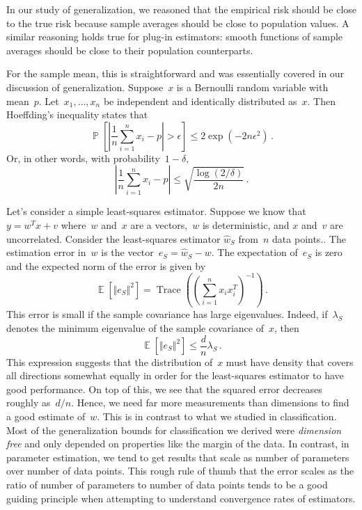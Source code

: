 \documentclass{tufte-book}
\begin{document}
In our study of generalization, we reasoned that the empirical risk
should be close to the true risk because sample averages should be close
to population values. A similar reasoning holds true for plug-in
estimators: smooth functions of sample averages should be close to their
population counterparts.

For the sample mean, this is straightforward and was essentially covered
in our discussion of generalization. Suppose~\(x\) is a Bernoulli random
variable with mean~\(p\). Let~\(x_1,\ldots,x_n\) be independent and
identically distributed as~\(x\). Then Hoeffding's inequality states
that \[
    \mathop\mathbb{P}\left[ \left| \frac{1}{n}\sum_{i=1}^n x_i - p \right| > \epsilon \right] \leq 2 \exp(-2n \epsilon^2)\,.
\] Or, in other words, with probability~\(1-\delta\), \[
     \left| \frac{1}{n}\sum_{i=1}^n x_i - p \right| \leq  \sqrt{\frac{\log(2/\delta)}{2n}}\,.
\]

Let's consider a simple least-squares estimator. Suppose we know that
\(y=w^T x + v\) where~\(w\) and~\(x\) are a vectors,~\(w\) is
deterministic, and \(x\) and~\(v\) are uncorrelated. Consider the
least-squares estimator \(\hat{w}_S\) from~\(n\) data points.. The
estimation error in~\(w\) is the vector~\(e_S = \hat{w}_S-w\). The
expectation of~\(e_S\) is zero and the expected norm of the error is
given by \[
    \mathop\mathbb{E}\left[ \Vert e_S \Vert^2 \right] = \operatorname{Trace} \left( \left( \sum_{i=1}^n x_i x_i^T \right)^{-1} \right)\,.
\] This error is small if the sample covariance has large eigenvalues.
Indeed, if~\(\lambda_S\) denotes the minimum eigenvalue of the sample
covariance of~\(x\), then \[
    \mathop\mathbb{E}\left[ \Vert e_S \Vert^2 \right] \leq \frac{d}{n} \lambda_S\,.
\] This expression suggests that the distribution of~\(x\) must have
density that covers all directions somewhat equally in order for the
least-squares estimator to have good performance. On top of this, we see
that the squared error decreases roughly as~\(d/n\). Hence, we need far
more measurements than dimensions to find a good estimate of~\(w\). This
is in contrast to what we studied in classification. Most of the
generalization bounds for classification we derived were \emph{dimension
free} and only depended on properties like the margin of the data. In
contrast, in parameter estimation, we tend to get results that scale as
number of parameters over number of data points. This rough rule of
thumb that the error scales as the ratio of number of parameters to
number of data points tends to be a good guiding principle when
attempting to understand convergence rates of estimators.
\end{document}
